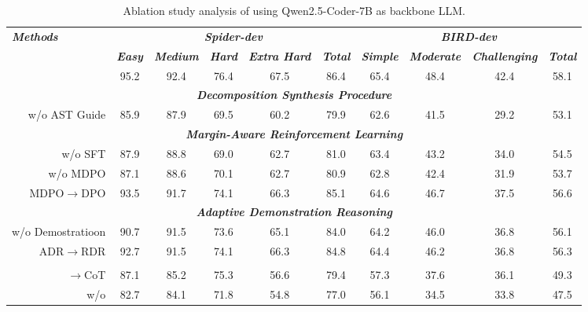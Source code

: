 \begin{table}[!t]
\centering
\caption{Ablation study analysis of \TheName{} using Qwen2.5-Coder-7B as backbone LLM.}
\label{tab:ablation-study}
\begin{tabular}{r|ccccc|cccc}
\toprule
\multicolumn{1}{l}{\multirow{2}{*}{\textit{\textbf{Methods}}}} & \multicolumn{5}{c}{\textit{\textbf{Spider-dev}}} & \multicolumn{4}{c}{\textit{\textbf{BIRD-dev}}} \\
\cmidrule(r){2-6}  \cmidrule(r){7-10}
\multicolumn{1}{l}{} & \textit{\textbf{Easy}} & \textit{\textbf{Medium}} & \textit{\textbf{Hard}} & \textit{\textbf{Extra Hard}} & \textit{\textbf{Total}} & \textit{\textbf{Simple}} & \textit{\textbf{Moderate}} & \textit{\textbf{Challenging}} & \textit{\textbf{Total}} \\
\midrule
\multicolumn{1}{l}{\TheName{}} & 95.2 & 92.4 & 76.4 & 67.5 & 86.4 & 65.4 & 48.4 & 42.4 & 58.1 \\
\midrule
\multicolumn{10}{c}{\textit{\textbf{Decomposition Synthesis Procedure}}} \\
\midrule
w/o AST Guide & 85.9 & 87.9 & 69.5 & 60.2 & 79.9 & 62.6 & 41.5 & 29.2 & 53.1 \\
\midrule
\multicolumn{10}{c}{\textit{\textbf{Margin-Aware Reinforcement Learning}}} \\
\midrule
w/o SFT & 87.9 & 88.8 & 69.0 & 62.7 & 81.0 & 63.4 & 43.2 & 34.0 & 54.5 \\
w/o MDPO & 87.1 & 88.6 & 70.1 & 62.7 & 80.9 & 62.8 & 42.4 & 31.9 & 53.7 \\
MDPO$\rightarrow$DPO & 93.5 & 91.7 & 74.1 & 66.3 & 85.1 & 64.6 & 46.7 & 37.5 & 56.6 \\
\midrule
\multicolumn{10}{c}{\textit{\textbf{Adaptive Demonstration Reasoning}}} \\
\midrule
w/o Demostratioon & 90.7 & 91.5 & 73.6 & 65.1 & 84.0 & 64.2 & 46.0 & 36.8 & 56.1 \\
ADR$\rightarrow$RDR & 92.7 & 91.5 & 74.1 & 66.3 & 84.8 & 64.4 & 46.2 & 36.8 & 56.3 \\
\midrule
\multicolumn{10}{c}{\textit{\textbf{\TheName{}}}} \\
\midrule
\TheName{}$\rightarrow$CoT & 87.1 & 85.2 & 75.3 & 56.6 & 79.4 & 57.3 & 37.6 & 36.1 & 49.3 \\
w/o \TheName{} & 82.7 & 84.1 & 71.8 & 54.8 & 77.0 & 56.1 & 34.5 & 33.8 & 47.5 \\
\bottomrule
\end{tabular}
\end{table}

